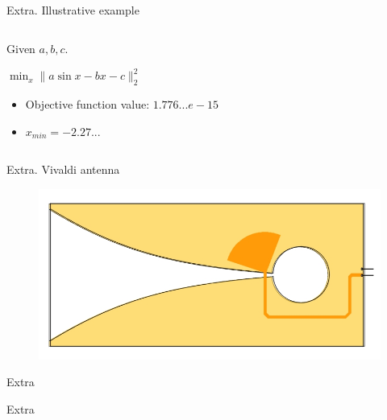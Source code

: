 \documentclass[../main.tex]{subfiles}
\begin{document}
\begin{frame}[t]{Extra. Illustrative example}

\begin{columns}[T]
\begin{column}{0.35\linewidth}
Given $a, b, c$.

\hfill

$\min_x \|a\sin{x} - bx - c\|_2^2$

\begin{itemize}
\item Objective function value: $1.776...e-15$
\item $x_{min} = -2.27...$
\end{itemize}

\end{column}

\begin{column}{0.65\linewidth}

\end{column}
\end{columns}

\end{frame}

\begin{frame}[t]{Extra. Vivaldi antenna}
\begin{figure}[H]
\begin{adjustbox}{width=0.65\linewidth}
\includegraphics{pics/vivaldi-print.jpg}
\end{adjustbox}
\end{figure}
\end{frame}

\begin{frame}[t]{Extra}
\end{frame}

\begin{frame}[t]{Extra}
\end{frame}
\backupend
\end{document}
